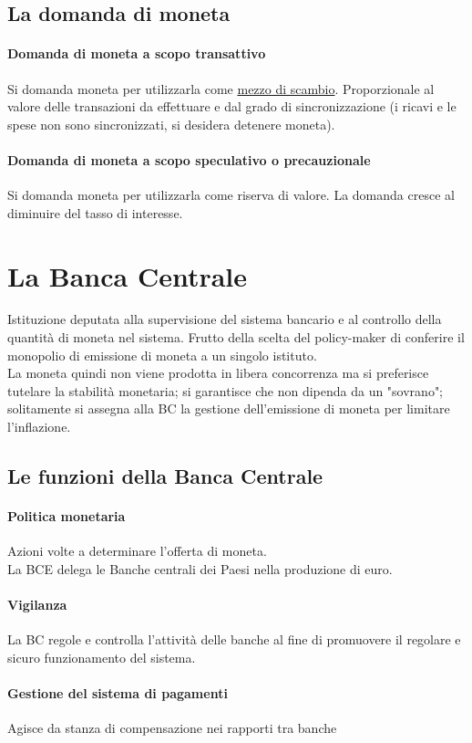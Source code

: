 \documentclass{report}
\begin{document}
	\subsection{La domanda di moneta}
	\paragraph{Domanda di moneta  a scopo transattivo} Si domanda moneta per utilizzarla come \underline{mezzo di scambio}. Proporzionale al valore delle transazioni da effettuare e dal grado di sincronizzazione (i ricavi e le spese non sono sincronizzati, si desidera detenere moneta).
	\paragraph{Domanda di moneta a scopo speculativo o precauzionale} Si domanda moneta per utilizzarla come riserva di valore. La domanda cresce al diminuire del tasso di interesse.
	\section{La Banca Centrale}
	Istituzione deputata alla supervisione del sistema bancario e al controllo della quantità di moneta nel sistema. Frutto della scelta del policy-maker di conferire il monopolio di emissione di moneta a un singolo istituto.
	\medskip \\La moneta quindi non viene prodotta in libera concorrenza ma si preferisce tutelare la stabilità monetaria; si garantisce che non dipenda da un "sovrano"; solitamente si assegna alla BC la gestione dell'emissione di moneta per limitare l'inflazione.
	\subsection{Le funzioni della Banca Centrale}
	\paragraph{Politica monetaria} Azioni volte a determinare l'offerta di moneta. \medskip \\La BCE delega le Banche centrali dei Paesi nella produzione di euro.
	\paragraph{Vigilanza} La BC regole e controlla l'attività delle banche al fine di promuovere il regolare e sicuro funzionamento del sistema.
	\paragraph{Gestione del sistema di pagamenti} Agisce da stanza di compensazione nei rapporti tra banche
\end{document}
